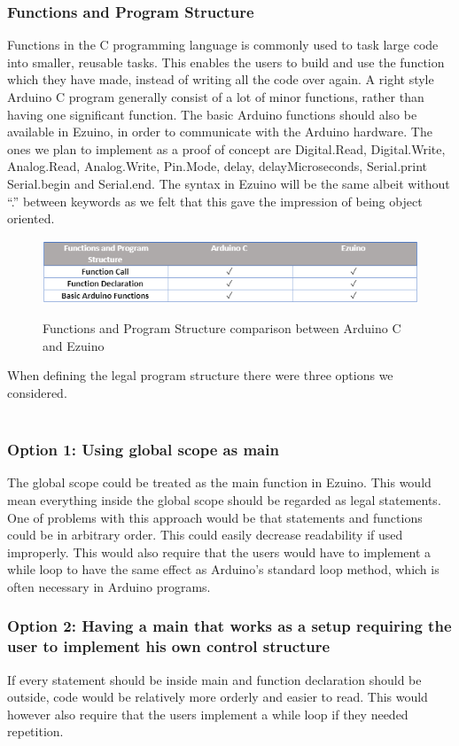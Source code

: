 \subsubsection*{Functions and Program Structure}
Functions in the C programming language is commonly used to task large code into smaller, reusable tasks. This enables the users to build and use the function which they have made, instead of writing all the code over again. A right style Arduino C program generally consist of a lot of minor functions, rather than having one significant function.
The basic Arduino functions should also be available in Ezuino, in order to communicate with the Arduino hardware. The ones we plan to implement as a proof of concept are Digital.Read, Digital.Write, Analog.Read, Analog.Write, Pin.Mode, delay, delayMicroseconds, Serial.print Serial.begin and Serial.end. The syntax in Ezuino will be the same albeit without “.” between keywords as we felt that this gave the impression of being object oriented.
\begin{figure}[H]
\centering
\caption{Functions and Program Structure comparison between Arduino C and Ezuino}
\includegraphics[scale=0.80]{figures/language_features/langf10.png}
\label{lf10}
\end{figure}
When defining the legal program structure there were three options we considered. \\ \\
\subsubsection{Option 1: Using global scope as main}
The global scope could be treated as the main function in Ezuino. This would mean everything inside the global scope should be regarded as legal statements. One of problems with this approach would be that statements and functions could be in arbitrary order. This could easily decrease readability if used improperly.
This would also require that the users would have to implement a while loop to have the same effect as Arduino’s standard loop method, which is often necessary in Arduino programs.


\subsubsection{Option 2: Having a main that works as a setup requiring the user to implement his own control structure}
If every statement should be inside main and function declaration should be outside, code would be relatively more orderly and easier to read.
This would however also require that the users implement a while loop if they needed repetition.


